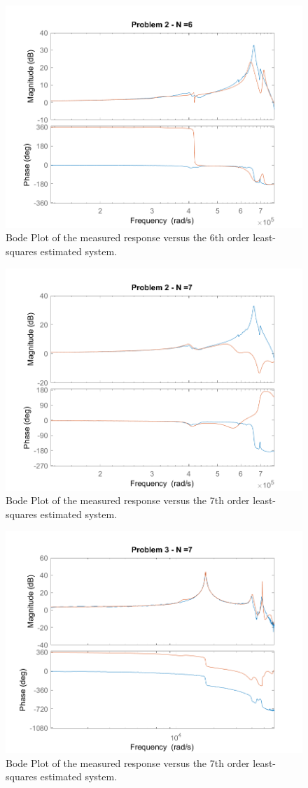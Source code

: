 \documentclass[]{article}
\begin{document}
		\begin{figure}[h]
			\centering
			\includegraphics[width=0.7\linewidth]{fig/MECH6325_CA1_pblm2_n=6}
			\caption{Bode Plot of the measured response versus the 6th order least-squares estimated system.}
			\label{fig:pblm2_n=6}
		\end{figure}

		\begin{figure}[h]
			\centering
			\includegraphics[width=0.7\linewidth]{fig/MECH6325_CA1_pblm2_n=7}
			\caption{Bode Plot of the measured response versus the 7th order least-squares estimated system.}
			\label{fig:pblm2_n=7}
		\end{figure}
		
		
		\begin{figure}[h]
			\centering
			\includegraphics[width=0.7\linewidth]{fig/MECH6325_CA1_pblm3_n=7}
			\caption{Bode Plot of the measured response versus the 7th order least-squares estimated system.}
			\label{fig:pblm3_n=7}
		\end{figure}
		
\end{document}
